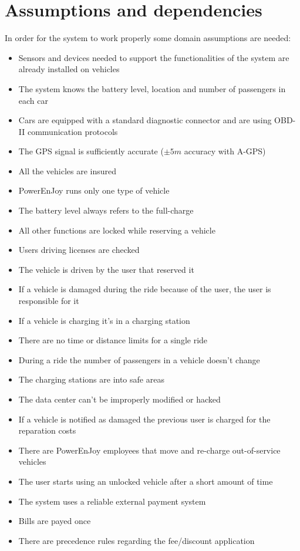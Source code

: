 \section{Assumptions and dependencies}
In order for the system to work properly some domain assumptions are needed:%
\begin{itemize}
	\item{Sensors and devices needed to support the functionalities of the system are already installed on vehicles}
	\item{The system knows the battery level, location and number of passengers in each car}
	\item{Cars are equipped with a standard diagnostic connector and are using OBD-II communication protocols}
	\item{The GPS signal is sufficiently accurate ($\pm5m$ accuracy with A-GPS)}
	\item{All the vehicles are insured}
	\item{PowerEnJoy runs only one type of vehicle}
	\item{The battery level always refers to the full-charge}

	\item{All other functions are locked while reserving a vehicle}
	\item{Users driving licenses are checked}
	\item{The vehicle is driven by the user that reserved it}
	\item{If a vehicle is damaged during the ride because of the user, the user is responsible for it}
	\item{If a vehicle is charging it's in a charging station}	
	
	\item{There are no time or distance limits for a single ride}
	\item{During a ride the number of passengers in a vehicle doesn't change}
	\item{The charging stations are into safe areas}
	\item{The data center can't be improperly modified or hacked}
	\item{If a vehicle is notified as damaged the previous user is charged for the reparation costs}
	\item{There are PowerEnJoy employees that move and re-charge out-of-service vehicles}

	\item{The user starts using an unlocked vehicle after a short amount of time}
	\item{The system uses a reliable external payment system}
	\item{Bills are payed once}
	\item{There are precedence rules regarding the fee/discount application}	
	
\end{itemize}
